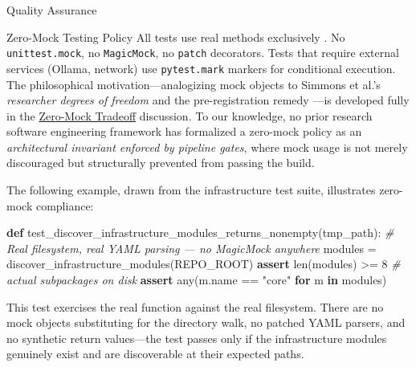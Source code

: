 \documentclass[
  ignorenonframetext,
]{beamer}
\author{\texorpdfstring{}{}}
\date{}
\newenvironment{Shaded}{}{}
\newcommand{\BuiltInTok}[1]{\textcolor[rgb]{0.00,0.50,0.00}{#1}}
\newcommand{\CommentTok}[1]{\textcolor[rgb]{0.38,0.63,0.69}{\textit{#1}}}
\newcommand{\ControlFlowTok}[1]{\textcolor[rgb]{0.00,0.44,0.13}{\textbf{#1}}}
\newcommand{\DecValTok}[1]{\textcolor[rgb]{0.25,0.63,0.44}{#1}}
\newcommand{\KeywordTok}[1]{\textcolor[rgb]{0.00,0.44,0.13}{\textbf{#1}}}
\newcommand{\NormalTok}[1]{#1}
\newcommand{\OperatorTok}[1]{\textcolor[rgb]{0.40,0.40,0.40}{#1}}
\newcommand{\StringTok}[1]{\textcolor[rgb]{0.25,0.44,0.63}{#1}}
\newcounter{none} %
\begin{document}
\begin{frame}{Quality Assurance}
\protect{}\label{quality-assurance}
\begin{block}{Zero-Mock Testing Policy}
\protect{}\label{zero-mock-testing-policy}
All tests use real methods exclusively . No \texttt{unittest.mock}, no \texttt{MagicMock},
no \texttt{patch} decorators. Tests that require external services
(Ollama, network) use \texttt{pytest.mark} markers for conditional
execution. The philosophical motivation---analogizing mock objects to
Simmons et al.'s \emph{researcher degrees of freedom}
 and the pre-registration remedy
---is developed fully in the
\href{05a_zeromock_tradeoff.md\#the-zero-mock-tradeoff}{Zero-Mock
Tradeoff} discussion. To our knowledge, no prior research software
engineering framework has formalized a zero-mock policy as an
\emph{architectural invariant enforced by pipeline gates}, where mock
usage is not merely discouraged but structurally prevented from passing
the build.

The following example, drawn from the infrastructure test suite,
illustrates zero-mock compliance:

\begin{Shaded}
\begin{Highlighting}[]
\KeywordTok{def}\NormalTok{ test\_discover\_infrastructure\_modules\_returns\_nonempty(tmp\_path):}
    \CommentTok{\# Real filesystem, real YAML parsing — no MagicMock anywhere}
\NormalTok{    modules }\OperatorTok{=}\NormalTok{ discover\_infrastructure\_modules(REPO\_ROOT)}
    \ControlFlowTok{assert} \BuiltInTok{len}\NormalTok{(modules) }\OperatorTok{\textgreater{}=} \DecValTok{8}           \CommentTok{\# actual subpackages on disk}
    \ControlFlowTok{assert} \BuiltInTok{any}\NormalTok{(m.name }\OperatorTok{==} \StringTok{"core"} \ControlFlowTok{for}\NormalTok{ m }\KeywordTok{in}\NormalTok{ modules)}
\end{Highlighting}
\end{Shaded}

This test exercises the real 
function against the real filesystem. There are no mock objects
substituting for the directory walk, no patched YAML parsers, and no
synthetic return values---the test passes only if the infrastructure
modules genuinely exist and are discoverable at their expected paths.
\end{block}


\end{frame}
\end{document}
